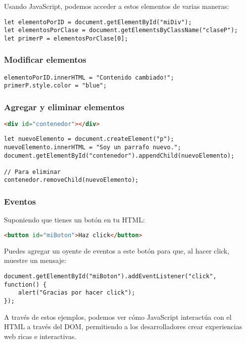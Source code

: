 \documentclass[executivepaper]{article}
\begin{document}
Usando JavaScript, podemos acceder a estos elementos de varias maneras:
\begin{lstlisting}
let elementoPorID = document.getElementById("miDiv");
let elementosPorClase = document.getElementsByClassName("claseP");
let primerP = elementosPorClase[0];
\end{lstlisting}

\subsubsection*{Modificar elementos}

\begin{lstlisting}
elementoPorID.innerHTML = "Contenido cambiado!";
primerP.style.color = "blue";
\end{lstlisting}

\subsubsection*{Agregar y eliminar elementos}

\begin{lstlisting}[language=HTML]
<div id="contenedor"></div>
\end{lstlisting}

\begin{lstlisting}
let nuevoElemento = document.createElement("p");
nuevoElemento.innerHTML = "Soy un parrafo nuevo.";
document.getElementById("contenedor").appendChild(nuevoElemento);

// Para eliminar
contenedor.removeChild(nuevoElemento);
\end{lstlisting}

\subsubsection*{Eventos}

Suponiendo que tienes un botón en tu HTML:
\begin{lstlisting}[language=HTML]
<button id="miBoton">Haz click</button>
\end{lstlisting}

Puedes agregar un oyente de eventos a este botón para que, al hacer click, muestre un mensaje:
\begin{lstlisting}
document.getElementById("miBoton").addEventListener("click", function() {
    alert("Gracias por hacer click");
});
\end{lstlisting}

A través de estos ejemplos, podemos ver cómo JavaScript interactúa con el HTML a través del DOM, permitiendo a los desarrolladores crear experiencias web ricas e interactivas.
\end{document}
